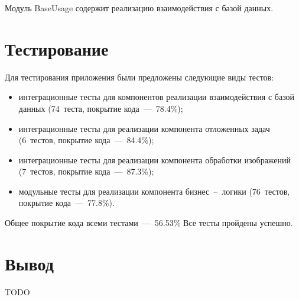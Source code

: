 Модуль BaseUsage содержит реализацию взаимодействия с базой данных.

\section{Тестирование}

Для тестирования приложения были предложены следующие виды тестов:
\begin{itemize}
	\item интеграционные тесты для компонентов реализации взаимодействия с базой данных (74~теста, покрытие кода~---~78.4\%);
	\item интеграционные тесты для реализации компонента отложенных задач (6~тестов, покрытие кода~---~84.4\%);
	\item интеграционные тесты для реализации компонента обработки изображений (7~тестов, покрытие кода~---~87.3\%);
	\item модульные тесты для реализации компонента бизнес~--~логики (76~тестов, покрытие кода~---~77.8\%).
\end{itemize}

Общее покрытие кода всеми тестами~---~56.53\%
Все тесты пройдены успешно.

\section*{Вывод}

TODO

\clearpage
